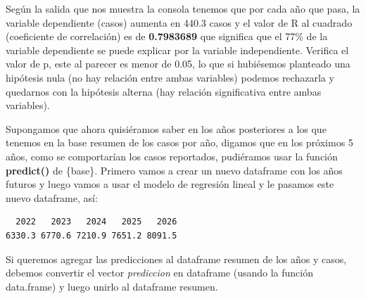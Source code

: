 \documentclass[
  letterpaper,
  DIV=11,
  numbers=noendperiod]{scrreprt}
\newenvironment{Shaded}{\begin{snugshade}}{\end{snugshade}}
\newcommand{\AttributeTok}[1]{\textcolor[rgb]{0.40,0.45,0.13}{#1}}
\newcommand{\CommentTok}[1]{\textcolor[rgb]{0.37,0.37,0.37}{#1}}
\newcommand{\DecValTok}[1]{\textcolor[rgb]{0.68,0.00,0.00}{#1}}
\newcommand{\FunctionTok}[1]{\textcolor[rgb]{0.28,0.35,0.67}{#1}}
\newcommand{\NormalTok}[1]{\textcolor[rgb]{0.00,0.23,0.31}{#1}}
\newcommand{\OtherTok}[1]{\textcolor[rgb]{0.00,0.23,0.31}{#1}}
\newcommand{\SpecialCharTok}[1]{\textcolor[rgb]{0.37,0.37,0.37}{#1}}
\begin{document}
Según la salida que nos muestra la consola tenemos que por cada año que
pasa, la variable dependiente (casos) aumenta en 440.3 casos y el valor
de R al cuadrado (coeficiente de correlación) es de \textbf{0.7983689}
que significa que el 77\% de la variable dependiente se puede explicar
por la variable independiente. Verifica el valor de p, este al parecer
es menor de 0.05, lo que si hubiésemos planteado una hipótesis nula (no
hay relación entre ambas variables) podemos rechazarla y quedarnos con
la hipótesis alterna (hay relación significativa entre ambas variables).

Supongamos que ahora quisiéramos saber en los años posteriores a los que
tenemos en la base resumen de los casos por año, digamos que en los
próximos 5 años, como se comportarían los casos reportados, pudiéramos
usar la función \textbf{predict()} de \{base\}. Primero vamos a crear un
nuevo dataframe con los años futuros y luego vamos a usar el modelo de
regresión lineal y le pasamos este nuevo dataframe, así:

\begin{Shaded}
\end{Shaded}

\begin{verbatim}
  2022   2023   2024   2025   2026 
6330.3 6770.6 7210.9 7651.2 8091.5 
\end{verbatim}

Si queremos agregar las predicciones al dataframe resumen de los años y
casos, debemos convertir el vector \emph{prediccion} en dataframe
(usando la función data.frame) y luego unirlo al dataframe resumen.
\end{document}
